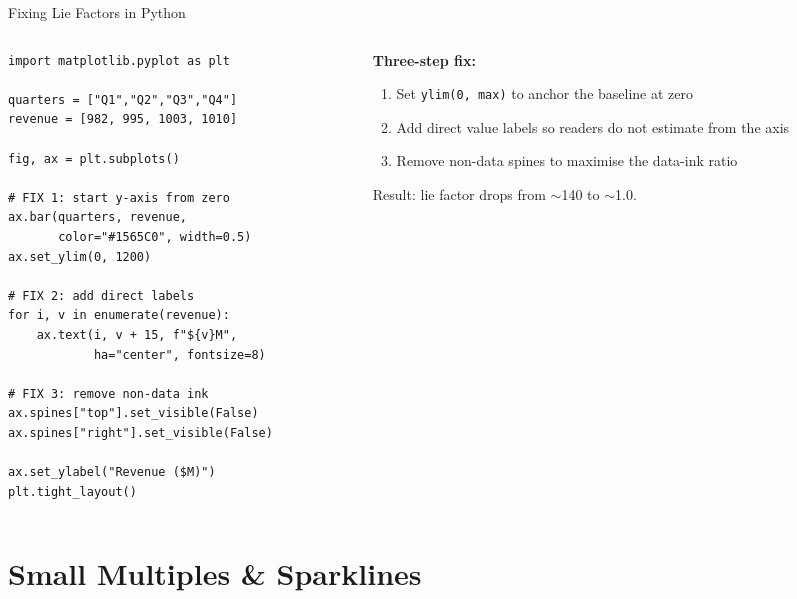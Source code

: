 \documentclass[10pt]{beamer}
\begin{document}
\begin{frame}[fragile]{Fixing Lie Factors in Python}
  \begin{columns}[T]
    \begin{column}{0.52\textwidth}
\begin{lstlisting}[style=pythonstyle]
import matplotlib.pyplot as plt

quarters = ["Q1","Q2","Q3","Q4"]
revenue = [982, 995, 1003, 1010]

fig, ax = plt.subplots()

# FIX 1: start y-axis from zero
ax.bar(quarters, revenue,
       color="#1565C0", width=0.5)
ax.set_ylim(0, 1200)

# FIX 2: add direct labels
for i, v in enumerate(revenue):
    ax.text(i, v + 15, f"${v}M",
            ha="center", fontsize=8)

# FIX 3: remove non-data ink
ax.spines["top"].set_visible(False)
ax.spines["right"].set_visible(False)

ax.set_ylabel("Revenue ($M)")
plt.tight_layout()
\end{lstlisting}
    \end{column}
    \begin{column}{0.45\textwidth}
      \textbf{Three-step fix:}

      \begin{enumerate}
        \item Set \texttt{ylim(0, max)} to anchor
              the baseline at zero
        \item Add direct value labels so readers
              do not estimate from the axis
        \item Remove non-data spines to maximise
              the data-ink ratio
      \end{enumerate}

      \vspace{4pt}
      {\small Result: lie factor drops from
      $\sim$140 to $\sim$1.0.}
    \end{column}
  \end{columns}
\end{frame}

\section{Small Multiples \& Sparklines}
\end{document}
